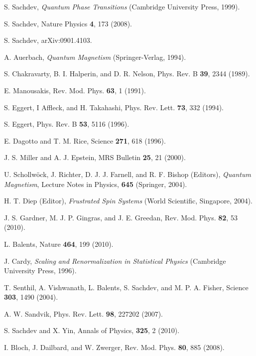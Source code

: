 \documentclass[draft,numberedheadings]{aipproc}
\begin{document}
\begin{thebibliography}{999}

S. Sachdev, {\it Quantum Phase Transitions} (Cambridge University Press, 1999).

S. Sachdev, Nature Physics {\bf 4}, 173 (2008).

S. Sachdev, arXiv:0901.4103.

A. Auerbach, {\it Quantum Magnetism} (Springer-Verlag, 1994).

S. Chakravarty, B. I. Halperin, and D. R. Nelson, Phys. Rev. B {\bf 39}, 2344 (1989).

E. Manousakis, Rev. Mod. Phys. {\bf 63}, 1 (1991).

S. Eggert, I Affleck, and H. Takahashi, Phys. Rev. Lett. {\bf 73}, 332 (1994).

S. Eggert, Phys. Rev. B {\bf 53}, 5116 (1996).

E. Dagotto and T. M. Rice, Science {\bf 271}, 618 (1996).

J. S. Miller and A. J. Epstein, MRS Bulletin {\bf 25}, 21 (2000).

U. Schollw\"ock, J. Richter, D. J. J. Farnell, and R. F. Bishop (Editors),
{\it Quantum Magnetism}, Lecture Notes in Physics, {\bf 645} (Springer, 2004).

H. T. Diep (Editor), {\it Frustrated Spin Systems} (World Scientific, Singapore, 2004).

J. S. Gardner, M. J. P. Gingras, and J. E. Greedan, Rev. Mod. Phys. {\bf 82}, 53 (2010). 

L. Balents, Nature {\bf 464}, 199 (2010).

J. Cardy, {\it Scaling and Renormalization in Statistical Physics} (Cambridge University Press, 1996).

T. Senthil, A. Vishwanath, L. Balents, S. Sachdev, and M. P. A. Fisher, Science 
{\bf 303}, 1490 (2004).

A. W. Sandvik, Phys. Rev. Lett. {\bf 98}, 227202 (2007).

S. Sachdev and X. Yin, Annals of Physics, {\bf 325}, 2 (2010).

I. Bloch, J. Dailbard, and W. Zwerger, Rev. Mod. Phys. {\bf 80}, 885 (2008).


\end{thebibliography}
\end{document}
